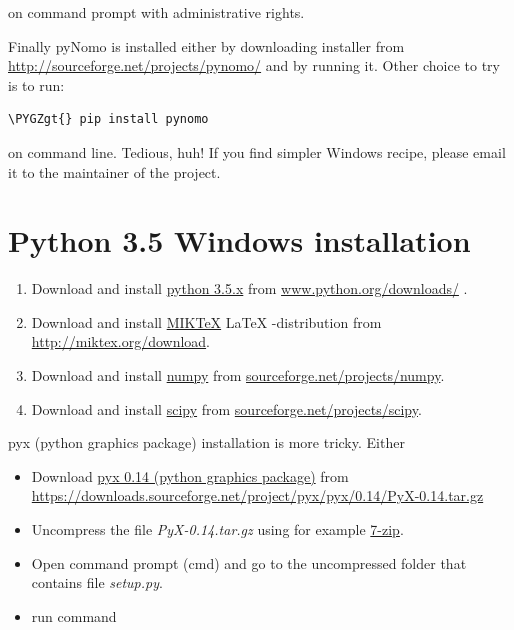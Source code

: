 \documentclass[a4paper,11pt,english]{sphinxmanual}
\def\PYGZgt{\char`\>}
\begin{document}
on command prompt with administrative rights.

Finally pyNomo is installed either by downloading installer from  \href{http://sourceforge.net/projects/pynomo/files/pynomo/}{http://sourceforge.net/projects/pynomo/} and by running it. Other choice to try is to run:

\begin{Verbatim}[commandchars=\\\{\},formatcom=\scriptsize]
\PYGZgt{} pip install pynomo
\end{Verbatim}

on command line. Tedious, huh! If you find simpler Windows recipe, please email it to the maintainer of the project.


\section{Python 3.5 Windows installation}
\label{installation/installation:python-3-5-windows-installation}\begin{enumerate}
\item {} 
Download and install \href{https://www.python.org}{python 3.5.x} from \href{https://www.python.org/downloads/}{www.python.org/downloads/} .

\item {} 
Download and install \href{http://miktex.org}{MIKTeX} LaTeX -distribution from \href{http://miktex.org/download}{http://miktex.org/download}.

\item {} 
Download and install \href{http://www.numpy.org}{numpy} from \href{http://sourceforge.net/projects/numpy/files/latest/download?source=files}{sourceforge.net/projects/numpy}.

\item {} 
Download and install \href{http://www.scipy.org}{scipy} from \href{http://sourceforge.net/projects/scipy/files/latest/download?source=files}{sourceforge.net/projects/scipy}.

\end{enumerate}

pyx (python graphics package) installation is more tricky. Either
\begin{itemize}
\item {} 
Download \href{http://pyx.sourceforge.net}{pyx 0.14 (python graphics package)} from \href{https://downloads.sourceforge.net/project/pyx/pyx/0.14/PyX-0.14.tar.gz}{https://downloads.sourceforge.net/project/pyx/pyx/0.14/PyX-0.14.tar.gz}

\item {} 
Uncompress the file \emph{PyX-0.14.tar.gz} using for example \href{http://www.7-zip.org}{7-zip}.

\item {} 
Open command prompt (cmd) and go to the uncompressed folder that contains file \emph{setup.py}.

\item {} 
run command 

\end{itemize}
\end{document}
